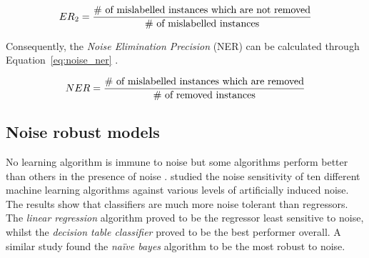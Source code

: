 \begin{equation}\label{eq:noise_type2}
	ER\textsubscript{2} = \frac{\textnormal{\# of mislabelled instances which are not removed}}{\textnormal{\# of mislabelled instances}}
\end{equation}

Consequently, the \textit{Noise Elimination Precision} (NER) can be calculated through Equation~\ref{eq:noise_ner} \citep{frenay2014classification}.

\begin{equation}\label{eq:noise_ner}
	NER = \frac{\textnormal{\# of mislabelled instances which are removed}}{\textnormal{\# of removed instances}}
\end{equation}

\subsection{Noise robust models}\label{sec:noise_robust_models}

No learning algorithm is immune to noise but some algorithms perform better than others in the presence of noise \citep{frenay2014comprehensive}.  \citet{kalapanidas2003machine} studied the noise sensitivity of ten different machine learning algorithms against various levels of artificially induced noise.  The results show that classifiers are much more noise tolerant than regressors.  The \textit{linear regression} algorithm proved to be the regressor least sensitive to noise, whilst the \textit{decision table classifier} proved to be the best performer overall.  A similar study \citep{nettleton2010study} found the \textit{naïve bayes} algorithm to be the most robust to noise.

